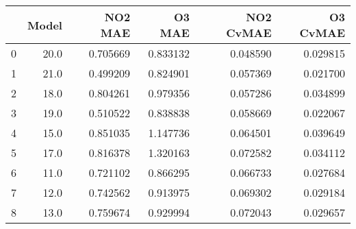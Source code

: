 \begin{tabular}{lrrrrr}
\toprule
{} &  Model &   NO2 MAE &    O3 MAE &  NO2 CvMAE &  O3 CvMAE \\
\midrule
0 &   20.0 &  0.705669 &  0.833132 &   0.048590 &  0.029815 \\
1 &   21.0 &  0.499209 &  0.824901 &   0.057369 &  0.021700 \\
2 &   18.0 &  0.804261 &  0.979356 &   0.057286 &  0.034899 \\
3 &   19.0 &  0.510522 &  0.838838 &   0.058669 &  0.022067 \\
4 &   15.0 &  0.851035 &  1.147736 &   0.064501 &  0.039649 \\
5 &   17.0 &  0.816378 &  1.320163 &   0.072582 &  0.034112 \\
6 &   11.0 &  0.721102 &  0.866295 &   0.066733 &  0.027684 \\
7 &   12.0 &  0.742562 &  0.913975 &   0.069302 &  0.029184 \\
8 &   13.0 &  0.759674 &  0.929994 &   0.072043 &  0.029657 \\
\bottomrule
\end{tabular}
